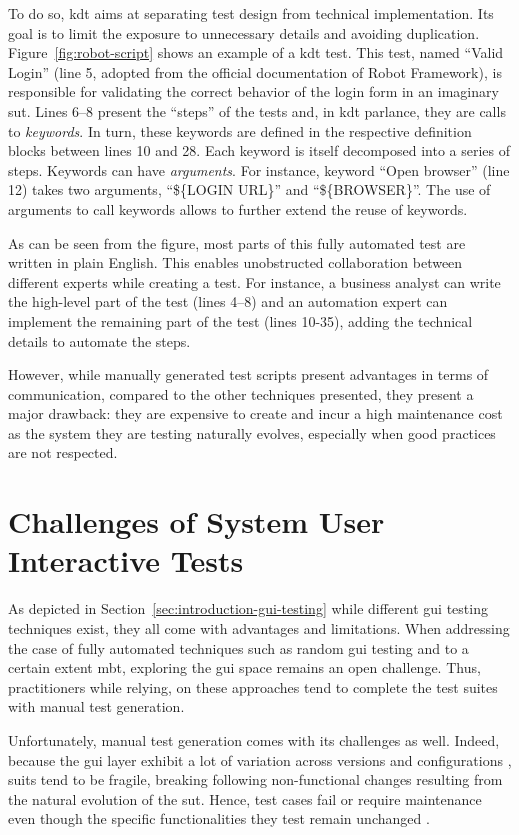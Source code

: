 To do so, \gls{kdt} \cite{Tang2008, Hametner2012} aims at separating test design from technical implementation. Its goal is to limit the exposure to unnecessary details and avoiding duplication. Figure~\ref{fig:robot-script} shows an example of a \gls{kdt} test. This test, named ``Valid Login'' (line 5, adopted from the official documentation of Robot Framework), is responsible for validating the correct behavior of the login form in an imaginary \gls{sut}. Lines 6--8 present the ``steps'' of the tests and, in \gls{kdt} parlance, they are calls to \emph{keywords}. In turn, these keywords are defined in the respective definition blocks between lines 10 and 28. Each keyword is itself decomposed into a series of steps. Keywords can have \emph{arguments}. For instance, keyword ``Open browser'' (line 12) takes two arguments, ``\$\{LOGIN URL\}'' and ``\$\{BROWSER\}''. The use of arguments to call keywords allows to further extend the reuse of keywords.

As can be seen from the figure, most parts of this fully automated test are written in plain English. This enables unobstructed collaboration between different experts while creating a test. For instance, a business analyst can write the high-level part of the test (lines 4--8) and an automation expert can implement the remaining part of the test (lines 10-35), adding the technical details to automate the steps.

However, while manually generated test scripts present advantages in terms of communication, compared to the other techniques presented, they present a major drawback: they are expensive to create and incur a high maintenance cost as the system they are testing naturally evolves, especially when good practices are not respected.

\section{Challenges of System User Interactive Tests}

As depicted in Section~\ref{sec:introduction-gui-testing} while different \gls{gui} testing techniques exist, they all come with advantages and limitations. When addressing the case of fully automated techniques such as random \gls{gui} testing and to a certain extent \gls{mbt}, exploring the \gls{gui} space remains an open challenge. Thus, practitioners while relying, on these approaches tend to complete the test suites with manual test generation.

Unfortunately, manual test generation comes with its challenges as well. Indeed, because the \gls{gui} layer exhibit a lot of variation across versions and configurations \cite{Gao2015}, \gls{suit}s  tend to be fragile, \ie breaking following non-functional changes resulting from the natural evolution of the \gls{sut}. Hence, test cases fail or require maintenance even though the specific functionalities they test remain unchanged \cite{Coppola2019, DiMartino2021}.

